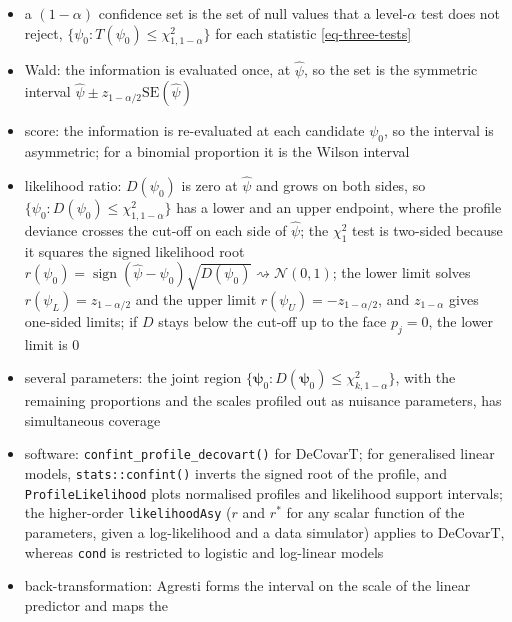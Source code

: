 \begin{itemize}
  \item a \((1-\alpha)\) confidence set is the set of null values that a level-\(\alpha\) test does not reject,
        \(\{\psi_{0}:T(\psi_{0})\le\chi^{2}_{1,1-\alpha}\}\) for each statistic \eqref{eq-three-tests}
        \cite[Sect.~4.3]{agrestiFoundationsLinearGeneralized2015}
  \item Wald: the information is evaluated once, at \(\hat\psi\), so the set is the symmetric interval
        \(\hat\psi\pm z_{1-\alpha/2}\mathrm{SE}(\hat\psi)\)
  \item score: the information is re-evaluated at each candidate \(\psi_{0}\), so the interval is asymmetric;
        for a binomial proportion it is the Wilson interval \cite{wilsonProbableInferenceLaw1927}
  \item likelihood ratio: \(D(\psi_{0})\) is zero at \(\hat\psi\) and grows on both sides, so
        \(\{\psi_{0}:D(\psi_{0})\le\chi^{2}_{1,1-\alpha}\}\) has a lower and an upper endpoint, where the profile deviance
        crosses the cut-off on each side of \(\hat\psi\); the \(\chi^{2}_{1}\) test is two-sided because it squares the
        signed likelihood root
        \(r(\psi_{0})=\operatorname{sign}(\hat\psi-\psi_{0})\sqrt{D(\psi_{0})}\rightsquigarrow\mathcal{N}(0,1)\); the lower limit solves
        \(r(\psi_{L})=z_{1-\alpha/2}\) and the upper limit \(r(\psi_{U})=-z_{1-\alpha/2}\), and \(z_{1-\alpha}\) gives one-sided
        limits; if \(D\) stays below the cut-off up to the face \(p_{j}=0\), the lower limit is \(0\)
  \item several parameters: the joint region \(\{\boldsymbol{\psi}_{0}:D(\boldsymbol{\psi}_{0})\le\chi^{2}_{k,1-\alpha}\}\), with the remaining
        proportions and the scales profiled out as nuisance parameters, has simultaneous coverage
  \item software: \texttt{confint\_profile\_decovart()} for DeCovarT; for generalised linear models,
        \texttt{stats::confint()} inverts the signed root of the profile, and \texttt{ProfileLikelihood} plots
        normalised profiles and likelihood support intervals; the higher-order \texttt{likelihoodAsy}
        (\(r\) and \(r^{\ast}\) for any scalar function of the parameters, given a log-likelihood and a data
        simulator) applies to DeCovarT, whereas \texttt{cond} is restricted to logistic and log-linear models
  \item back-transformation: Agresti forms the interval on the scale of the linear predictor and maps the

\end{itemize}
